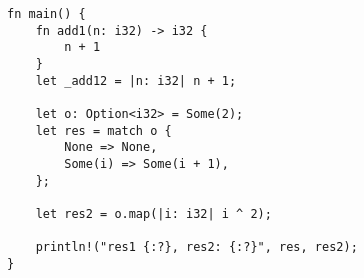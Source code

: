 \documentclass[11pt]{article}
\author{Jürgen Keck}
\date{\today}
\title{}
\begin{document}
\tableofcontents

\begin{verbatim}
fn main() {
    fn add1(n: i32) -> i32 {
        n + 1
    }
    let _add12 = |n: i32| n + 1;

    let o: Option<i32> = Some(2);
    let res = match o {
        None => None,
        Some(i) => Some(i + 1),
    };

    let res2 = o.map(|i: i32| i ^ 2);

    println!("res1 {:?}, res2: {:?}", res, res2);
}
\end{verbatim}
\end{document}
